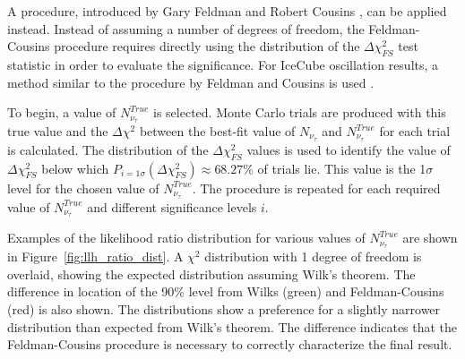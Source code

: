 A procedure, introduced by Gary Feldman and Robert Cousins \cite{feldman_cousins}, can be applied instead.
Instead of assuming a number of degrees of freedom, the Feldman-Cousins procedure requires directly using the distribution of the $\Delta \chi^2_{FS}$ test statistic in order to evaluate the significance.
For IceCube oscillation results, a method similar to the procedure by Feldman and Cousins is used \cite{IceCube-Oscillation2018}.

To begin, a value of ${N_{\nu_\tau}^{True}}$ is selected.
Monte Carlo trials are produced with this true value and the $\Delta \chi^2$ between the best-fit value of ${N_{\nu_\tau}}$ and ${N_{\nu_\tau}^{True}}$ for each trial is calculated.
The distribution of the $\Delta \chi^2_{FS}$ values is used to identify the value of $\Delta \chi^2_{FS}$ below which ${P_{i=1\sigma}\left(\Delta \chi^2_{FS}\right) \approx 68.27\%}$ of trials lie.
This value is the 1${\sigma}$ level for the chosen value of ${N_{\nu_\tau}^{True}}$.
The procedure is repeated for each required value of ${N_{\nu_\tau}^{True}}$ and different significance levels ${i}$.

Examples of the likelihood ratio distribution for various values of ${N_{\nu_\tau}^{True}}$ are shown in Figure~\ref{fig:llh_ratio_dist}.
A ${\chi^2}$ distribution with 1 degree of freedom is overlaid, showing the expected distribution assuming Wilk's theorem. 
The difference in location of the 90\% level from Wilks (green) and Feldman-Cousins (red) is also shown.
The distributions show a preference for a slightly narrower distribution than expected from Wilk's theorem.
The difference indicates that the Feldman-Cousins procedure is necessary to correctly characterize the final result.

